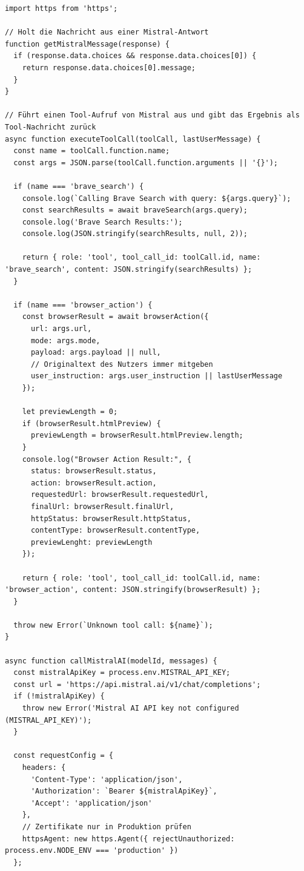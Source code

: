 \begin{lstlisting}
import https from 'https';

// Holt die Nachricht aus einer Mistral-Antwort
function getMistralMessage(response) {
  if (response.data.choices && response.data.choices[0]) {
    return response.data.choices[0].message;
  }
}

// Führt einen Tool-Aufruf von Mistral aus und gibt das Ergebnis als Tool-Nachricht zurück
async function executeToolCall(toolCall, lastUserMessage) {
  const name = toolCall.function.name;
  const args = JSON.parse(toolCall.function.arguments || '{}');

  if (name === 'brave_search') {
    console.log(`Calling Brave Search with query: ${args.query}`);
    const searchResults = await braveSearch(args.query);
    console.log('Brave Search Results:');
    console.log(JSON.stringify(searchResults, null, 2));

    return { role: 'tool', tool_call_id: toolCall.id, name: 'brave_search', content: JSON.stringify(searchResults) };
  }

  if (name === 'browser_action') {
    const browserResult = await browserAction({
      url: args.url,
      mode: args.mode,
      payload: args.payload || null,
      // Originaltext des Nutzers immer mitgeben
      user_instruction: args.user_instruction || lastUserMessage
    });

    let previewLength = 0;
    if (browserResult.htmlPreview) {
      previewLength = browserResult.htmlPreview.length;
    }
    console.log("Browser Action Result:", {
      status: browserResult.status,
      action: browserResult.action,
      requestedUrl: browserResult.requestedUrl,
      finalUrl: browserResult.finalUrl,
      httpStatus: browserResult.httpStatus,
      contentType: browserResult.contentType,
      previewLenght: previewLength
    });

    return { role: 'tool', tool_call_id: toolCall.id, name: 'browser_action', content: JSON.stringify(browserResult) };
  }

  throw new Error(`Unknown tool call: ${name}`);
}

async function callMistralAI(modelId, messages) {
  const mistralApiKey = process.env.MISTRAL_API_KEY;
  const url = 'https://api.mistral.ai/v1/chat/completions';
  if (!mistralApiKey) {
    throw new Error('Mistral AI API key not configured (MISTRAL_API_KEY)');
  }

  const requestConfig = {
    headers: {
      'Content-Type': 'application/json',
      'Authorization': `Bearer ${mistralApiKey}`,
      'Accept': 'application/json'
    },
    // Zertifikate nur in Produktion prüfen
    httpsAgent: new https.Agent({ rejectUnauthorized: process.env.NODE_ENV === 'production' })
  };


\end{lstlisting}
